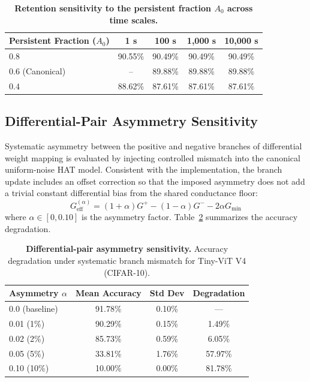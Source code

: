 \begin{table}[ht]
\centering
\caption{\textbf{Retention sensitivity to the persistent fraction $A_0$ across time scales.}}
\label{tab:retention-sensitivity}
\begin{tabular}{@{}lcccc@{}}
\toprule
\textbf{Persistent Fraction ($A_0$)} & \textbf{1 s} & \textbf{100 s} & \textbf{1,000 s} & \textbf{10,000 s} \\
\midrule
$0.8$ & 90.55\% & 90.49\% & 90.49\% & 90.49\% \\
$0.6$ (Canonical) & -- & 89.88\% & 89.88\% & 89.88\% \\
$0.4$ & 88.62\% & 87.61\% & 87.61\% & 87.61\% \\
\bottomrule
\end{tabular}
\end{table}

\subsection{Differential-Pair Asymmetry Sensitivity}
\label{subsec:supp-asymmetry-sensitivity}

Systematic asymmetry between the positive and negative branches of differential weight mapping is evaluated by injecting controlled mismatch into the canonical uniform-noise HAT model. Consistent with the implementation, the branch update includes an offset correction so that the imposed asymmetry does not add a trivial constant differential bias from the shared conductance floor:
\begin{equation}
G^{(\alpha)}_{\mathrm{eff}} = (1+\alpha)G^{+} - (1-\alpha)G^{-} - 2\alpha G_{\min}
\end{equation}
where $\alpha \in [0, 0.10]$ is the asymmetry factor. Table~\ref{tab:asymmetry-sensitivity} summarizes the accuracy degradation.

\begin{table}[ht]
\centering
\caption{\textbf{Differential-pair asymmetry sensitivity.} Accuracy degradation under systematic branch mismatch for Tiny-ViT V4 (CIFAR-10).}
\label{tab:asymmetry-sensitivity}
\begin{tabular}{@{}lccc@{}}
\toprule
\textbf{Asymmetry $\alpha$} & \textbf{Mean Accuracy} & \textbf{Std Dev} & \textbf{Degradation} \\
\midrule
0.0 (baseline) & 91.78\% & 0.10\% & — \\
0.01 (1\%) & 90.29\% & 0.15\% & 1.49\% \\
0.02 (2\%) & 85.73\% & 0.59\% & 6.05\% \\
0.05 (5\%) & 33.81\% & 1.76\% & 57.97\% \\
0.10 (10\%) & 10.00\% & 0.00\% & 81.78\% \\
\bottomrule
\end{tabular}
\end{table}

